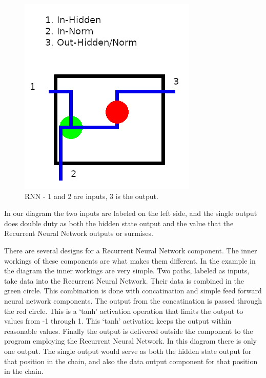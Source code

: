 \begin{figure}[H]
	\begin{center}
	
	\includegraphics[scale=0.5]{diagram-rnn}
		
	\end{center}
	\caption[Recurrent Neural Network]{RNN - 1 and 2 are inputs, 3 is the output.}
	

\end{figure}

In our diagram the two inputs are labeled on the left side, and the single output does double duty as both the hidden state output and the value that the Recurrent Neural Network outputs or surmises.

There are several designs for a Recurrent Neural Network component. The inner workings of these components are what makes them different. In the example in the diagram the inner workings are very simple. Two paths, labeled as inputs, take data into the Recurrent Neural Network. Their data is combined in the green circle. This combination is done with concatination and simple feed forward neural network components. The output from the concatination is passed through the red circle. This is a `tanh' activation operation that limits the output to values from -1 through 1. This `tanh' activation keeps the output within reasonable values. Finally the output is delivered outside the component to the program employing the Recurrent Neural Network. In this diagram there is only one output. The single output would serve as both the hidden state output for that position in the chain, and also the data output component for that position in the chain.



